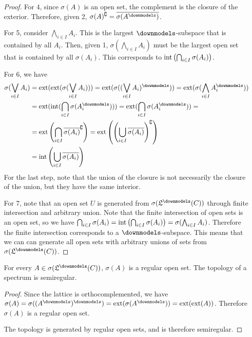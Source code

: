 \begin{mathSection}
\begin{proof}
	For 4, since $\sigma(A)$ is an open set, the complement is the closure of the exterior. Therefore, given 2, $\sigma(A)^{\complement} = \overline{\sigma(A^{\separate})}$.
	
	For 5, consider $\bigwedge_{i \in I} A_i$. This is the largest $\separate$-subspace that is contained by all $A_i$. Then, given 1, $\sigma\left(\bigwedge_{i \in I} A_i\right)$ must be the largest open set that is contained by all $\sigma(A_i)$. This corresponds to $\operatorname{int}\left(\bigcap_{i \in I} \sigma(A_i)\right)$.
	
	For 6, we have
	\begin{align*}
		\sigma(\bigvee_{i \in I} A_i) &= \exterior(\exterior(\sigma(\bigvee_{i \in I} A_i))) = \exterior(\sigma((\bigvee_{i \in I} A_i)^{\separate})) = \exterior(\sigma(\bigwedge_{i \in I} A_i^{\separate})) \\
		&= \exterior(\interior(\bigcap_{i \in I} \sigma(A_i^{\separate}))) = \exterior(\bigcap_{i \in I} \sigma(A_i^{\separate})) =  \\
		&= \exterior\left(\bigcap_{i \in I}\overline{\sigma(A_i)}^{\complement}\right) = \exterior\left(\left(\bigcup_{i \in I}\overline{\sigma(A_i)}\right)^{\complement}\right) \\
		&= \interior\left(\bigcup_{i \in I}\overline{\sigma(A_i)}\right)
	\end{align*}
	For the last step, note that the union of the closure is not necessarily the closure of the union, but they have the same interior.
	
	For 7, note that an open set $U$ is generated from $\sigma(\mathfrak{L}^\separate(C))$ through finite intersection and arbitrary union. Note that the finite intersection of open sets is an open set, so we have $\bigcap_{i \in I} \sigma(A_i) = \operatorname{int}\left(\bigcap_{i \in I} \sigma(A_i)\right) = \sigma(\bigwedge_{i \in I} A_i)$. Therefore the finite intersection corresponds to a $\separate$-subspace. This means that we can can generate all open sets with arbitrary unions of sets from $\sigma(\mathfrak{L}^\separate(C))$.
\end{proof}
\end{mathSection}

\begin{coro}
For every $A \in\sigma(\mathfrak{L}^\separate(C))$, $\sigma(A)$ is a regular open set. The topology of a spectrum is semiregular.
\end{coro}

\begin{proof}
Since the lattice is orthocomplemented, we have $\sigma(A) = \sigma((A^{\separate})^{\separate}) = \exterior(\sigma(A^{\separate})) = \exterior(\exterior(A))$. Therefore $\sigma(A)$ is a regular open set.

The topology is generated by regular open sets, and is therefore semiregular.
\end{proof}

